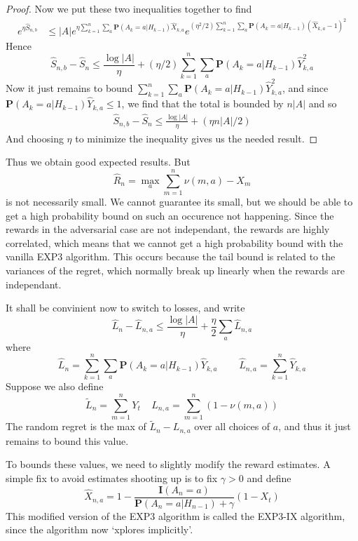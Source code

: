 \begin{proof}
    Now we put these two inequalities together to find
    \begin{align*}
        e^{\eta \widehat{S}_{n,b}} &\leq |A| e^{\eta \sum_{k=1}^n \sum_a \mathbf{P}(A_k = a | H_{k-1}) \widehat{X}_{k,a}} e^{(\eta^2/2) \sum_{k = 1}^n \sum_a \mathbf{P}(A_k = a | H_{k-1}) (\widehat{X}_{k,a} - 1)^2}
    \end{align*}
    Hence
    \[ \widehat{S}_{n,b} - \widehat{S}_n \leq \frac{\log |A|}{\eta} + (\eta/2) \sum_{k = 1}^n \sum_a \mathbf{P}(A_k = a | H_{k-1}) \widehat{Y}_{k,a}^2 \]
    Now it just remains to bound $\sum_{k = 1}^n \sum_a \mathbf{P}(A_k = a | H_{k-1}) \widehat{Y}_{k,a}^2$, and since $\mathbf{P}(A_k = a | H_{k-1}) \widehat{Y}_{k,a} \leq 1$, we find that the total is bounded by $n |A|$ and so
    \begin{align*}
        \widehat{S}_{n,b} - \widehat{S}_n \leq \frac{\log |A|}{\eta} + (\eta n |A|/2)
    \end{align*}
    And choosing $\eta$ to minimize the inequality gives us the needed result.
\end{proof}

Thus we obtain good expected results. But
%
\[ \widehat{R}_n = \max_a \sum_{m = 1}^n \nu(m,a) - X_m \]
%
is not necessarily small. We cannot guarantee its small, but we should be able to get a high probability bound on such an occurence not happening. Since the rewards in the adversarial case are not independant, the rewards are highly correlated, which means that we cannot get a high probability bound with the vanilla EXP3 algorithm. This occurs because the tail bound is related to the variances of the regret, which normally break up linearly when the rewards are independant.

It shall be convinient now to switch to losses, and write
%
\[ \widehat{L}_n - \widehat{L}_{n,a} \leq \frac{\log |A|}{\eta} + \frac{\eta}{2} \sum_a \widehat{L}_{n,a} \]
%
where
\[ \widehat{L}_n = \sum_{k = 1}^n \sum_a \mathbf{P}(A_k = a | H_{k-1}) \widehat{Y}_{k,a}\ \ \ \ \ \ \ \ \ \ \widehat{L}_{n,a} = \sum_{k = 1}^n \widehat{Y}_{k,a} \]
%
Suppose we also define
%
\[ \tilde{L}_n = \sum_{m = 1}^n Y_t\ \ \ \ \ L_{n,a} = \sum_{m = 1}^n (1 - \nu(m,a)) \]
%
The random regret is the max of $\tilde{L}_n - L_{n,a}$ over all choices of $a$, and thus it just remains to bound this value.

To bounds these values, we need to slightly modify the reward estimates. A simple fix to avoid estimates shooting up is to fix $\gamma > 0$ and define
%
\[ \widehat{X}_{n,a} = 1 - \frac{\mathbf{I}(A_n = a)}{\mathbf{P}(A_n = a | H_{n-1}) + \gamma} (1 - X_t) \]
%
This modified version of the EXP3 algorithm is called the EXP3-IX algorithm, since the algorithm now `xplores implicitly'.

